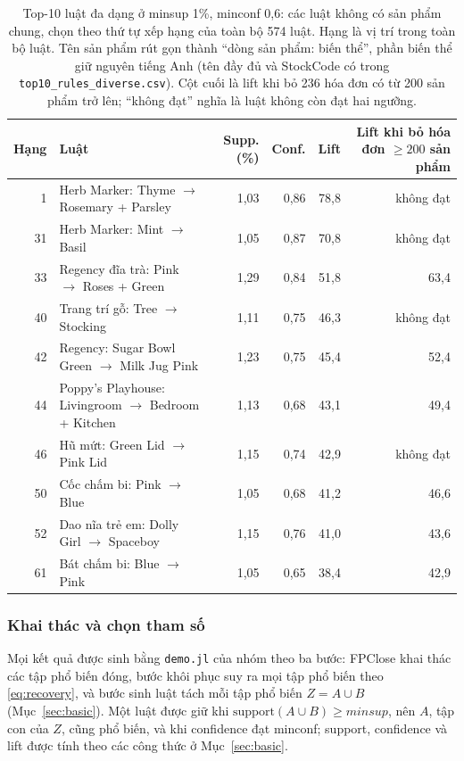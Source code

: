 \begin{table}[!t]
\centering
\caption{Top-10 luật đa dạng ở minsup 1\%, minconf 0,6: các luật không có sản phẩm chung, chọn theo thứ tự xếp hạng của
toàn bộ 574 luật. Hạng là vị trí trong toàn bộ luật. Tên sản phẩm rút gọn thành ``dòng sản phẩm: biến thể'', phần biến
thể giữ nguyên tiếng Anh (tên đầy đủ và StockCode có trong \texttt{top10\_rules\_diverse.csv}). Cột cuối là lift khi bỏ 236
hóa đơn có từ 200 sản phẩm trở lên; ``không đạt'' nghĩa là luật không còn đạt hai ngưỡng.}
\label{tab:app1-diverse}
\footnotesize
\begin{tabular}{rlrrrr}\hline
Hạng & Luật & Supp. (\%) & Conf. & Lift & Lift khi bỏ hóa đơn $\geq 200$ sản phẩm\\\hline
1 & Herb Marker: Thyme $\rightarrow$ Rosemary + Parsley & 1{,}03 & 0{,}86 & 78{,}8 & không đạt\\
31 & Herb Marker: Mint $\rightarrow$ Basil & 1{,}05 & 0{,}87 & 70{,}8 & không đạt\\
33 & Regency đĩa trà: Pink $\rightarrow$ Roses + Green & 1{,}29 & 0{,}84 & 51{,}8 & 63{,}4\\
40 & Trang trí gỗ: Tree $\rightarrow$ Stocking & 1{,}11 & 0{,}75 & 46{,}3 & không đạt\\
42 & Regency: Sugar Bowl Green $\rightarrow$ Milk Jug Pink & 1{,}23 & 0{,}75 & 45{,}4 & 52{,}4\\
44 & Poppy's Playhouse: Livingroom $\rightarrow$ Bedroom + Kitchen & 1{,}13 & 0{,}68 & 43{,}1 & 49{,}4\\
46 & Hũ mứt: Green Lid $\rightarrow$ Pink Lid & 1{,}15 & 0{,}74 & 42{,}9 & không đạt\\
50 & Cốc chấm bi: Pink $\rightarrow$ Blue & 1{,}05 & 0{,}68 & 41{,}2 & 46{,}6\\
52 & Dao nĩa trẻ em: Dolly Girl $\rightarrow$ Spaceboy & 1{,}15 & 0{,}76 & 41{,}0 & 43{,}6\\
61 & Bát chấm bi: Blue $\rightarrow$ Pink & 1{,}05 & 0{,}65 & 38{,}4 & 42{,}9\\
\hline
\end{tabular}
\end{table}

\subsubsection{Khai thác và chọn tham số}
Mọi kết quả được sinh bằng \texttt{demo.jl} của nhóm theo ba bước: FPClose khai thác các tập phổ biến đóng, bước khôi
phục suy ra mọi tập phổ biến theo \eqref{eq:recovery}, và bước sinh luật tách mỗi tập phổ biến $Z = A \cup B$
(Mục~\ref{sec:basic}). Một luật được giữ khi $\mathrm{support}(A \cup B) \geq \mathit{minsup}$, nên $A$, tập con của
$Z$, cũng phổ biến, và khi confidence đạt minconf; support, confidence và lift được tính theo các công thức ở
Mục~\ref{sec:basic}.

